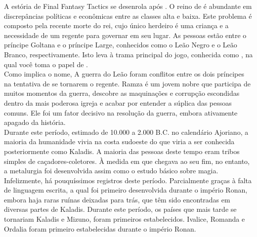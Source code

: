 %
A estória de Final Fantasy Tactics se desenrola após .
O reino de  é abundante em discrepâncias políticas e econômicas entre as classes alta e baixa.
Este problema é composto pela recente morte do rei, cujo único herdeiro é uma criança e a necessidade de um regente para governar em seu lugar.
As pessoas estão entre o príncipe Goltana e o príncipe Large, conhecidos como o Leão Negro e o Leão Branco, respectivamente.
Isto leva à trama principal do jogo, conhecida como , na qual você toma o papel de .\\
Como implica o nome, A guerra do Leão foram conflitos entre os dois príncipes na tentativa de se tornarem o regente.
Ramza é um jovem nobre que participa de muitos momentos da guerra, descobre as maquinações e corrupção escondidas dentro da mais poderosa igreja e acabar por entender a súplica das pessoas comuns.
Ele foi um fator decisivo na resolução da guerra, embora ativamente apagado da história.
%
%
%
\clearpage
%
%
\\
Durante este período, estimado de 10.000 a 2.000 B.C. no calendário Ajoriano, a maioria da humanidade vivia na costa sudoeste do que viria a ser conhecida posteriormente como Kaladis.
A maioria das pessoas deste tempo eram tribos simples de caçadores-coletores. À medida em que chegava ao seu fim, no entanto, a metalurgia foi desenvolvida assim como o estudo básico sobre magia.
Infelizmente, há pouquíssimos registros deste período. Parcialmente graças à falta de linguagem escrita, a qual foi primeiro desenvolvida durante o império Ronan, embora haja raras ruínas deixadas para trás, que têm sido encontradas em diversas partes de Kaladis.
Durante este período, os países que mais tarde se tornariam Kaladis e Mizuno, foram primeiros estabelecidos. Ivalice, Romanda e Ordalia foram primeiro estabelecidas durante o império Ronan.
%
\ofpar
